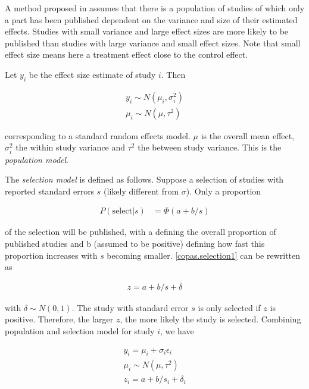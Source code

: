 \documentclass[11pt,a4paper,twoside]{book}\usepackage[]{graphicx}\usepackage[]{color}
\begin{document}
A method proposed in \cite{Copas1,Copas2,Copas3} assumes that there is a population of studies of which only a part has been published dependent on the variance and size of their estimated effects. Studies with small variance and large effect sizes are more likely to be published than studies with large variance and small effect sizes. Note that small effect size means here a treatment effect close to the control effect.

Let $y_i$ be the effect size estimate of study $i$. Then 

\begin{align}
y_{i} \sim N(\mu_{i}, \sigma_{i}^2) \\
\mu_{i} \sim N(\mu, \tau^2)
\end{align}

corresponding to a standard random effects model. $\mu$ is the overall mean effect, $\sigma_{i}^2$ the within study variance and $\tau^2$ the between study variance. This is the \textit{population model}.

\vspace{0mm}
The \textit{selection model} is defined as follows. Suppose a selection of studies with reported standard errors $s$ (likely different from $\sigma$). Only a proportion 

\begin{align}
P(\textrm{select}|s) &= \Phi(a + b/s) \label{copas.selection1}
\end{align}

of the selection will be published, with a defining the overall proportion of published studies and b (assumed to be positive) defining how fast this proportion increases with $s$ becoming smaller. \ref{copas.selection1} can be rewritten as 

\begin{align}
z = a + b/s + \delta \label{copas.selection2}
\end{align}

with $\delta \sim N(0,1)$. The study with standard error $s$ is only selected if $z$ is positive. Therefore, the larger $z$, the more likely the study is selected.
Combining population and selection model for study $i$, we have 

\begin{align}
y_{i} = \mu_{i} + \sigma_{i}\epsilon_{i} \\
\mu_{i} \sim N(\mu, \tau^2) \\
z_{i} = a + b/s_{i} + \delta_{i}
\end{align}
\end{document}
